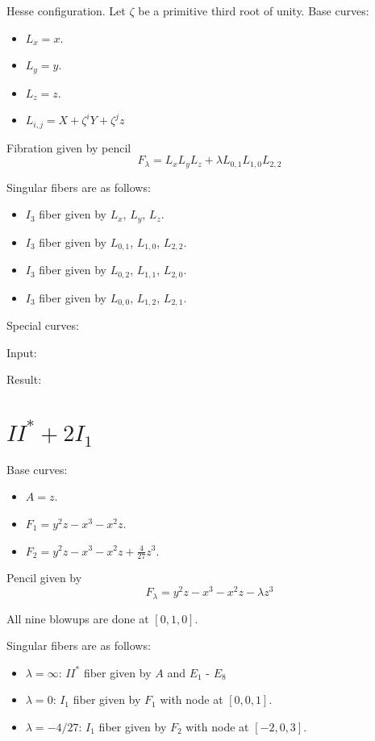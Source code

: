 \documentclass{article}
\begin{document}
Hesse configuration. Let $\zeta$ be a primitive third root of unity. Base curves:
\begin{itemize}
  \item $L_x = x$.
  \item $L_y = y$.
  \item $L_z = z$.
  \item $L_{i,j} = X + \zeta^i Y + \zeta^j z$
\end{itemize}
Fibration given by pencil
\[F_\lambda = L_x L_y L_z + \lambda L_{0,1} L_{1,0} L_{2,2}\]

Singular fibers are as follows:
\begin{itemize}
  \item $I_3$ fiber given by $L_x$, $L_y$, $L_z$.
  \item $I_3$ fiber given by $L_{0,1}$, $L_{1,0}$, $L_{2,2}$.
  \item $I_3$ fiber given by $L_{0,2}$, $L_{1,1}$, $L_{2,0}$.
  \item $I_3$ fiber given by $L_{0,0}$, $L_{1,2}$, $L_{2,1}$.
\end{itemize}
Special curves:

Input:

Result:


\section{$II^* + 2I_1$}

Base curves:
\begin{itemize}
  \item $A = z$.
  \item $F_1 = y^2z - x^3 - x^2z$.
  \item $F_2 = y^2z - x^3 - x^2z +\frac{4}{27}z^3$.
\end{itemize}
Pencil given by
\[F_\lambda = y^2z - x^3 - x^2z - \lambda z^3\]

All nine blowups are done at $[0,1,0]$.

Singular fibers are as follows:
\begin{itemize}
  \item $\lambda = \infty$: $II^*$ fiber given by $A$ and $E_1$ - $E_8$
  \item $\lambda = 0$: $I_1$ fiber given by $F_1$ with node at $[0,0,1]$.
  \item $\lambda = -4/27$: $I_1$ fiber given by $F_2$ with node at $[-2,0,3]$.
\end{itemize}
\end{document}
